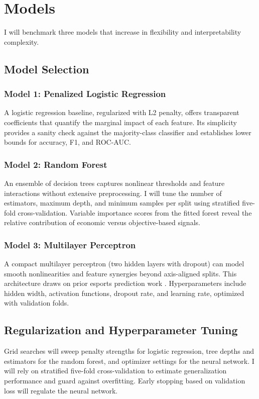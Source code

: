 \documentclass[aps,prl,preprint,groupedaddress]{revtex4-2}
\begin{document}
\section{Models}
\label{sec:models}

I will benchmark three models that increase in flexibility and interpretability complexity.

\subsection{Model Selection}

\subsubsection{Model 1: Penalized Logistic Regression}
A logistic regression baseline, regularized with L2 penalty, offers transparent coefficients that quantify the marginal impact of each feature. Its simplicity provides a sanity check against the majority-class classifier and establishes lower bounds for accuracy, F1, and ROC-AUC.

\subsubsection{Model 2: Random Forest}
An ensemble of decision trees captures nonlinear thresholds and feature interactions without extensive preprocessing. I will tune the number of estimators, maximum depth, and minimum samples per split using stratified five-fold cross-validation. Variable importance scores from the fitted forest reveal the relative contribution of economic versus objective-based signals.

\subsubsection{Model 3: Multilayer Perceptron}
A compact multilayer perceptron (two hidden layers with dropout) can model smooth nonlinearities and feature synergies beyond axis-aligned splits. This architecture draws on prior esports prediction work \cite{liu2021ml}. Hyperparameters include hidden width, activation functions, dropout rate, and learning rate, optimized with validation folds.

\subsection{Regularization and Hyperparameter Tuning}
Grid searches will sweep penalty strengths for logistic regression, tree depths and estimators for the random forest, and optimizer settings for the neural network. I will rely on stratified five-fold cross-validation to estimate generalization performance and guard against overfitting. Early stopping based on validation loss will regulate the neural network.
\end{document}
